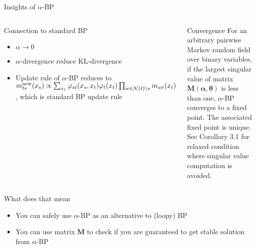 \begin{frame}[label=current]{Insights of $\alpha$-BP}
  \begin{columns}
    \begin{block}{\small Connection to standard BP}
      \begin{itemize}[label=$\bullet$]
      \item $\alpha \rightarrow 0$ 
      \item $\alpha$-divergence reduce KL-divergence
      \item Update rule of $\alpha$-BP reduces to ${m}^{\text{new}}_{ts}(x_s) \propto \sum_{x_t} \varphi_{st}(x_s, x_t) {\varphi}_t(x_t) \prod_{w\in \mathcal{N}(t)\backslash s}m_{wt}(x_t)$, which is standard BP update rule
        
      \end{itemize}
    \end{block}
    \begin{block}{\small Convergence}
        For an arbitrary pairwise Markov random field over binary variables,
        if the largest singular value of matrix $\bm{M}(\bm{\alpha}, \bm{\theta})$ is less than one,
        $\alpha$-BP converges to a fixed point. The associated fixed point is unique.
        \vfill
        {\tiny See Corollary 3.1 for relaxed condition where singular value computation is avoided.}
    \end{block}
  \end{columns}
  \vskip 0.5cm
  \begin{block}{\small What does that mean}
    \begin{itemize}[label=$\bullet$]
    \item You can safely use $\alpha$-BP as an alternative to (loopy) BP
    \item You can use matrix $\bm{M}$ to check if you are guaranteed to get stable solution from $\alpha$-BP
    \end{itemize}
  \end{block}
  \let\thefootnote\relax{}
\end{frame}
